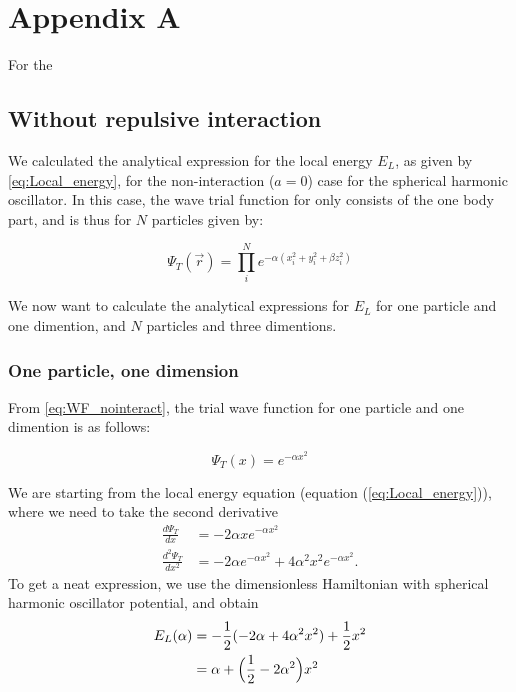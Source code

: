 \documentclass[norsk,a4paper,12pt]{article}
\begin{document}
\newpage

\section*{Appendix A} \label{appendix_A}

For the 
\subsection{Without repulsive interaction}
We calculated the analytical expression for the local energy $E_L$, as given by \ref{eq:Local_energy}, for the non-interaction ($a=0$) case for the spherical harmonic oscillator. In this case, the wave trial function for only consists of the one body part, and is thus for $N$ particles given by:

\begin{equation}
	\label{eq:WF_nointeract}
	\Psi_T(\vec{r}) = \prod_i^N e^{-\alpha(x_i^2 + y_i^2 + \beta z_i^2)}
\end{equation}

We now want to calculate the analytical expressions for $E_L$ for one particle and one dimention, and $N$ particles and three dimentions.

\subsubsection{One particle, one dimension}

From \ref{eq:WF_nointeract}, the trial wave function for one particle and one dimention is as follows:

\begin{equation}
	\label{eq:WF_1dim_1N}
	\Psi_T(x) = e^{-\alpha x^2} 
\end{equation}

We are starting from the local energy equation (equation (\ref{eq:Local_energy})), where we need to take the second derivative
\begin{align}
\frac{d\Psi_T}{dx}&=-2\alpha xe^{-\alpha x^2}\\
\frac{d^2\Psi_T}{dx^2}&=-2\alpha e^{-\alpha x^2}+4\alpha^2x^2e^{-\alpha x^2}.
\end{align}
To get a neat expression, we use the dimensionless Hamiltonian with spherical harmonic oscillator potential, and obtain
\begin{align}
E_L(\alpha)&=-\frac{1}{2}(-2\alpha + 4\alpha^2x^2)+\frac{1}{2}x^2\notag\\
&=\alpha+\Big(\frac{1}{2}-2\alpha^2\Big)x^2
\end{align}
\end{document}

